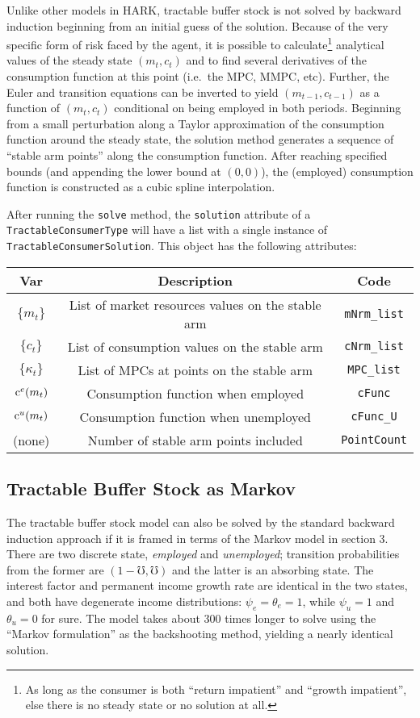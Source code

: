 \documentclass[12pt,titlepage,letterpaper]{econtex}
\begin{document}
Unlike other models in HARK, tractable buffer stock is not solved by backward induction beginning from an initial guess of the solution.  Because of the very specific form of risk faced by the agent, it is possible to calculate\footnote{As long as the consumer is both ``return impatient'' and ``growth impatient'', else there is no steady state or no solution at all.} analytical values of the steady state $(m_t,c_t)$ and to find several derivatives of the consumption function at this point (i.e.\ the MPC, MMPC, etc).  Further, the Euler and transition equations can be inverted to yield $(m_{t-1},c_{t-1})$ as a function of $(m_t,c_t)$ conditional on being employed in both periods.  Beginning from a small perturbation along a Taylor approximation of the consumption function around the steady state, the solution method generates a sequence of ``stable arm points'' along the consumption function.  After reaching specified bounds (and appending the lower bound at $(0,0)$), the (employed) consumption function is constructed as a cubic spline interpolation.

After running the \texttt{solve} method, the \texttt{solution} attribute of a \texttt{TractableConsumerType} will have a list with a single instance of \texttt{TractableConsumerSolution}.  This object has the following attributes:

\begin{table}[h!]
\centering
\begin{tabular}{c c c}
Var & Description & Code \\
\hline
$\{m_t\}$ & List of market resources values on the stable arm & \texttt{mNrm\_list} \\
$\{c_t\}$ & List of consumption values on the stable arm & \texttt{cNrm\_list} \\
$\{\kappa_t\}$ & List of MPCs at points on the stable arm & \texttt{MPC\_list} \\
$\mathrm{c}^e(m_t)$ & Consumption function when employed & \texttt{cFunc} \\
$\mathrm{c}^u(m_t)$ & Consumption function when unemployed & \texttt{cFunc\_U} \\
(none) & Number of stable arm points included & \texttt{PointCount}
\end{tabular}
\end{table}

\subsection{Tractable Buffer Stock as Markov}

The tractable buffer stock model can also be solved by the standard backward induction approach if it is framed in terms of the Markov model in section 3.  There are two discrete state, \textit{employed} and \textit{unemployed}; transition probabilities from the former are $(1-\mho,\mho)$ and the latter is an absorbing state.  The interest factor and permanent income growth rate are identical in the two states, and both have degenerate income distributions: $\psi_e = \theta_e = 1$, while $\psi_u = 1$ and $\theta_u = 0$ for sure.  The model takes about 300 times longer to solve using the ``Markov formulation'' as the backshooting method, yielding a nearly identical solution.
\end{document}
